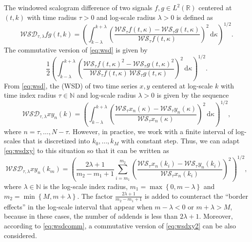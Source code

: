 The windowed scalogram difference of two signals
$f,g\in L^2\left( \mathbb{R}\right) $ centered at $(t,k)$ with time radius $\tau >0$ and log-scale
radius $\lambda >0$ is defined as
\begin{equation}
\label{eq:wsd}
\mathcal{WSD}_{\tau ,\lambda } fg(t,k)=\left( \int _{k-\lambda } ^{k+\lambda } \left( \frac{\mathcal{WS}_{\tau }f(t,\kappa ) - \mathcal{WS}_{\tau }g(t,\kappa )}{\mathcal{WS}_{\tau }f(t,\kappa )}\right) ^2 \, \mathrm{d}\kappa \right) ^{1/2}.
\end{equation}
The commutative version of \eqref{eq:wsd} is given by
\begin{equation}
\label{eq:wsdcomm}
\frac{1}{2}\left( \int _{k-\lambda } ^{k+\lambda } \left( \frac{\mathcal{WS}_{\tau }f(t,\kappa ) ^2- \mathcal{WS}_{\tau }g(t,\kappa )^2}{\mathcal{WS}_{\tau }f(t,\kappa )\, \mathcal{WS}_{\tau }g(t,\kappa )} \right)^2 \, \mathrm{d}\kappa \right) ^{1/2}.
\end{equation}
From \eqref{eq:wsd}, the  (WSD) of two time series $x,y$ centered at log-scale $k$ with time index radius $\tau \in \mathbb{N}$ and log-scale radius $\lambda >0$ is given by the sequence
\begin{equation}
\label{eq:wsdxy}
\mathcal{WSD}_{\tau ,\lambda } xy_n(k)=\left( \int _{k-\lambda } ^{k+\lambda } \left( \frac{\mathcal{WS}_{\tau }x_n(\kappa ) - \mathcal{WS}_{\tau }y_n(\kappa )}{\mathcal{WS}_{\tau }x_n(\kappa )}\right) ^2 \, \mathrm{d}\kappa \right) ^{1/2},
\end{equation}
where $n=\tau ,\ldots ,N-\tau $. However, in practice, we work with a finite interval of log-scales that is discretized into $k_0,\ldots ,k_M$ with constant step. Thus, we can adapt \eqref{eq:wsdxy} to this situation so that it can be written as
\begin{equation}
\label{eq:wsdxy2}
\mathcal{WSD}_{\tau ,\lambda } xy_n(k_m)=
\left( \frac{2\lambda +1}{m_2-m_1+1} \sum _{i=m_1} ^{m_2} \left( \frac{\mathcal{WS}_{\tau }x_n(k_i) - \mathcal{WS}_{\tau }y_n(k_i)}{\mathcal{WS}_{\tau }x_n(k_i)}\right) ^2\right) ^{1/2},
\end{equation}
where $\lambda \in \mathbb{N}$ is the log-scale index radius, $m_1=\max \left\{ 0,m-\lambda \right\} $ and $m_2=\min \left\{ M,m+\lambda \right\} $. The factor $\frac{2\lambda +1}{m_2-m_1+1}$ is added to counteract the ``border effects'' in the log-scale interval that appear when $m-\lambda <0$ or $m+\lambda >M$, because in these cases, the number of addends is less than $2\lambda +1$. Moreover, according to \eqref{eq:wsdcomm}, a commutative version of \eqref{eq:wsdxy2} can be also considered.

